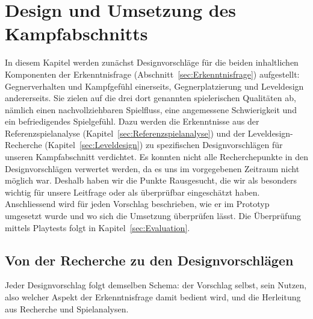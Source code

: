 \documentclass[../Main.tex]{subfiles}
\begin{document}
\section{Design und Umsetzung des Kampfabschnitts} \label{sec:Umsetzung}

In diesem Kapitel werden zunächst Designvorschläge für die beiden inhaltlichen Komponenten der Erkenntnisfrage (Abschnitt~\ref{sec:Erkenntnisfrage}) aufgestellt: Gegnerverhalten und Kampfgefühl einerseits, Gegnerplatzierung und Leveldesign andererseits. Sie zielen auf die drei dort genannten spielerischen Qualitäten ab, nämlich einen nachvollziehbaren Spielfluss, eine angemessene Schwierigkeit und ein befriedigendes Spielgefühl. Dazu werden die Erkenntnisse aus der Referenzspielanalyse (Kapitel~\ref{sec:Referenzspielanalyse}) und der Leveldesign-Recherche (Kapitel~\ref{sec:Leveldesign}) zu spezifischen Designvorschlägen für unseren Kampfabschnitt verdichtet. Es konnten nicht alle Recherchepunkte in den Designvorschlägen verwertet werden, da es uns im vorgegebenen Zeitraum nicht möglich war. Deshalb haben wir die Punkte Rausgesucht, die wir als besonders wichtig für unsere Leitfrage oder als überprüfbar eingeschätzt haben. Anschliessend wird für jeden Vorschlag beschrieben, wie er im Prototyp umgesetzt wurde und wo sich die Umsetzung überprüfen lässt. Die Überprüfung mittels Playtests folgt in Kapitel~\ref{sec:Evaluation}.

\subsection{Von der Recherche zu den Designvorschlägen} \label{sec:Designvorschlaege}

Jeder Designvorschlag folgt demselben Schema: der Vorschlag selbst, sein Nutzen, also welcher Aspekt der Erkenntnisfrage damit bedient wird, und die Herleitung aus Recherche und Spielanalysen.
\end{document}
